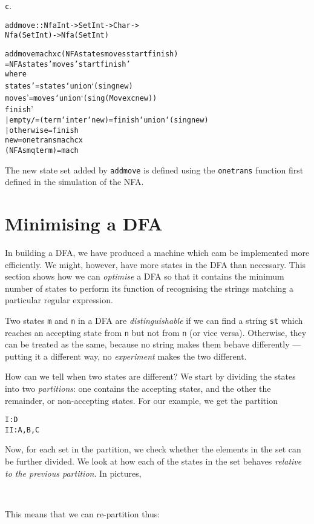 \documentclass[11pt]{article}
\begin{document}
{\tt c}.
\begin{alltt}
addmove :: Nfa Int -> Set Int -> Char -> 
           Nfa (Set Int) -> Nfa (Set Int)

addmove mach x c (NFA states moves start finish)
  = NFA states' moves' start finish'
    where 
    states' = states `union` (sing new)
    moves'  = moves  `union` (sing (Move x c new))
    finish' 
     | empty /= (term `inter` new)    = finish `union` (sing new)	
     | otherwise                      = finish       		
    new = onetrans mach c x
    (NFA s m q term) = mach
\end{alltt}
The new state set
added by {\tt addmove} is defined using the {\tt onetrans} function first
defined in the simulation of the NFA.

\section{Minimising a DFA}

In building a DFA, we have produced a machine which cam be implemented more
efficiently. We might, however, have more states in the DFA than necessary.
This section shows how we can {\em optimise\/} a DFA so that it contains the
minimum number of states to perform its function of recognising the strings
matching a particular regular expression.

Two states {\tt m} and {\tt n} 
in a DFA are {\em distinguishable\/} if we can find a string {\tt st} which
reaches an accepting state from {\tt n} but not from {\tt n} (or vice versa).
Otherwise, they can be treated as the same, because no string makes them
behave differently --- putting it a different way, no {\em experiment\/} makes
the two different.

How can we tell when two states are different? We start by dividing the states
into two {\em partitions}: one contains the accepting states, and the other
the remainder, or non-accepting states. For our example, we get the partition

\begin{alltt}
I:  D
II: A,B,C
\end{alltt}
Now, for each set in the partition, we check whether the elements in the set
can be further divided. We look at how each of the states in the set behaves
{\em relative to the previous partition}. In pictures,
\noindent
\begin{center}\  \end{center}
This means that we can re-partition thus:
\end{document}

